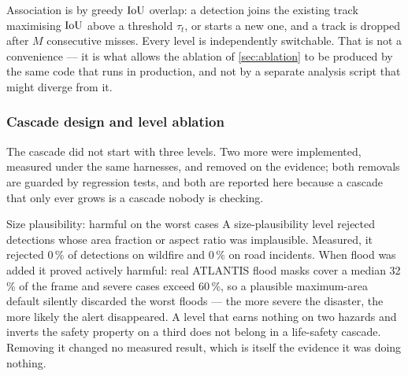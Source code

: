 Association is by greedy $\operatorname{IoU}$ overlap: a detection joins the existing track
maximising $\operatorname{IoU}$ above a threshold $\tau_t$, or starts a new one, and a track
is dropped after $M$ consecutive misses. Every level is independently
switchable. That is not a convenience — it is what allows the ablation of
\cref{sec:ablation} to be produced by the same code that runs in production,
and not by a separate analysis script that might diverge from it.

\subsubsection{Cascade design and level ablation}
\label{sec:removed-levels}

The cascade did not start with three levels. Two more were implemented,
measured under the same harnesses, and removed on the evidence; both removals
are guarded by regression tests, and both are reported here because a cascade
that only ever grows is a cascade nobody is checking.

\begin{recorded}{Size plausibility: harmful on the worst cases}
A size-plausibility level rejected detections whose area fraction or aspect
ratio was implausible. Measured, it rejected 0\,\% of detections on wildfire
and 0\,\% on road incidents. When flood was added it proved actively harmful:
real ATLANTIS flood masks cover a median 32\,\% of the frame and severe cases
exceed 60\,\%, so a plausible maximum-area default silently discarded the
worst floods — the more severe the disaster, the more likely the alert
disappeared. A level that earns nothing on two hazards and inverts the safety
property on a third does not belong in a life-safety cascade. Removing it
changed no measured result, which is itself the evidence it was doing nothing.
\end{recorded}

